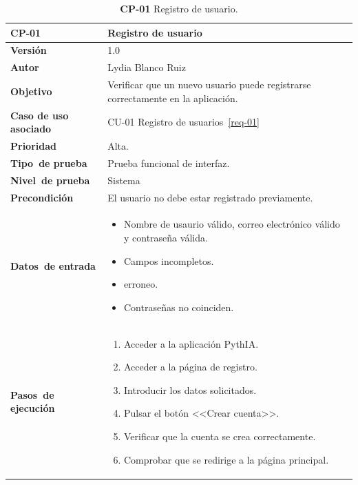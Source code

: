 \begin{table}[p]
	\centering
	\begin{tabularx}{\linewidth}{ p{} p{} }
		\toprule
		\textbf{CP-01}    & \textbf{Registro de usuario}\\
		\toprule
		\textbf{Versión}              & 1.0    \\
		\textbf{Autor}                & Lydia Blanco Ruiz \\
		\textbf{Objetivo}			 & Verificar que un nuevo usuario puede registrarse correctamente en la aplicación.\\
		\textbf{Caso de uso asociado} &  CU-01 Registro de usuarios~\ref{req-01}\\
		\textbf{Prioridad}          & Alta. \\
		\textbf{\mbox{Tipo de} \mbox{prueba}}         & Prueba funcional de interfaz. \\
		\textbf{\mbox{Nivel de} \mbox{prueba}}        & Sistema\\
		\textbf{Precondición}        & El usuario no debe estar registrado previamente. \\
		\textbf{\mbox{Datos de} \mbox{entrada}} 		& 
		\begin{itemize}
		\tightlist
			\item Nombre de usaurio válido, correo electrónico válido y contraseña válida.
			\item Campos incompletos.
			\item \eng{Email} erroneo.
			\item Contraseñas no coinciden.
		\end{itemize}				
		\\
		\textbf{\mbox{Pasos de} \mbox{ejecución}}		&
		\begin{enumerate}
		\tightlist
			\item Acceder a la aplicación \eng{web} PythIA.
			\item Acceder a la página de registro.
			\item Introducir los datos solicitados.
			\item Pulsar el botón <<Crear cuenta>>.
			\item Verificar que la cuenta se crea correctamente.
			\item Comprobar que se redirige a la página principal.
		\end{enumerate} \\
		\bottomrule
	\end{tabularx}
	\caption{\textbf{CP-01} Registro de usuario.}
	\label{prueb-01}
\end{table}


